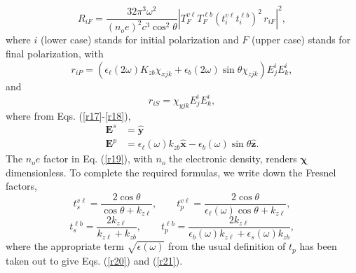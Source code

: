 \documentclass{article}
\begin{document}
\begin{equation}\label{r19}
 R_{iF}=\frac{32\pi^3\omega^2}{(n_oe)^2c^3\cos^2\theta}
\left|T_F^{v\ell}T_F^{\ell b}(t_i^{v\ell}t_i^{\ell b})^2\,r_{iF}\right|^2,
\end{equation}
where $i$ (lower case) stands for initial polarization and $F$ (upper case)
stands for final polarization, with
\begin{equation}\label{r20}
r_{iP}=\left(\epsilon_\ell(2\omega)K_{zb}\chi_{xjk} + \epsilon_b(2\omega)\sin\theta\chi_{zjk}\right)
E_j^i E_k^i,
\end{equation}
and
\begin{equation}\label{r21}
r_{iS}=\chi_{yjk}  E_j^i E_k^i,
\end{equation}
where from Eqs. (\ref{r17}-\ref{r18}),
\begin{subequations}\label{r23}
\begin{align}
\mathbf{E}^s&=\hat{\mathbf{y}}\\
\mathbf{E}^p&=\epsilon_\ell(\omega)k_{zb}\hat{\mathbf{x}}-\epsilon_b(\omega)\sin\theta\hat{\mathbf{z}}.
\end{align}
\end{subequations}
The $n_oe$ factor in Eq. (\ref{r19}), with $n_o$ the electronic density,
renders $\boldsymbol{\chi}$ dimensionless.
To complete the required formulas, we write down the Fresnel factors,
\begin{equation}\label{e.f1}
t_s^{v\ell}=\frac{2\cos\theta}{\cos\theta+k_{z\ell}},
\quad\quad
t_p^{v\ell}=\frac{2\cos\theta}{\epsilon_\ell(\omega)\cos\theta+k_{z\ell}},
\end{equation}
\begin{equation}\label{e.f3}
t_s^{\ell b}=\frac{2k_{z\ell}}{k_{z\ell}+k_{zb}},
\quad\quad
t_p^{\ell b}=\frac{2k_{z\ell}}{\epsilon_b(\omega)k_{z\ell}+\epsilon_s(\omega)k_{zb}},
\end{equation}
where the appropriate term $\sqrt{\epsilon(\omega)}$ from the usual definition of
$t_p$ has been taken out to give Eqs. (\ref{r20}) and
(\ref{r21}).



\end{document}
